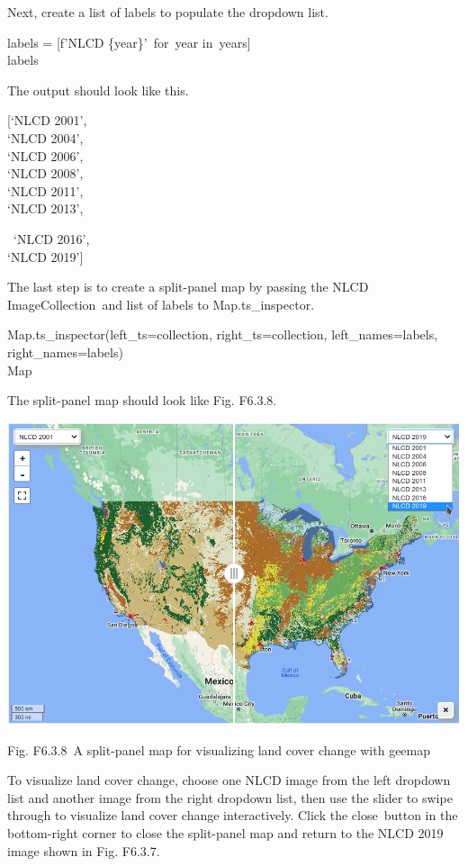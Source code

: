 \documentclass[
  letterpaper,
  DIV=11,
  numbers=noendperiod]{scrreprt}
\begin{document}
Next, create a list of labels to populate the dropdown list.

labels = {[}f'NLCD \{year\}'~for~year in~years{]}\\
labels

The output should look like this.

{[}`NLCD 2001',\\
`NLCD 2004',\\
`NLCD 2006',\\
`NLCD 2008',\\
`NLCD 2011',\\
`NLCD 2013',

~`NLCD 2016',\\
`NLCD 2019'{]}

The last step is to create a split-panel map by passing the NLCD
ImageCollection~and list of labels to Map.ts\_inspector.

Map.ts\_inspector(left\_ts=collection, right\_ts=collection,
left\_names=labels, right\_names=labels)\\
Map

The split-panel map should look like Fig. F6.3.8.

\includegraphics{./F6/image34.png}

Fig. F6.3.8~A split-panel map for visualizing land cover change with
geemap

To visualize land cover change, choose one NLCD image from the left
dropdown list and another image from the right dropdown list, then use
the slider to swipe through to visualize land cover change
interactively. Click the close~button in the bottom-right corner to
close the split-panel map and return to the NLCD 2019 image shown in
Fig. F6.3.7.
\end{document}
